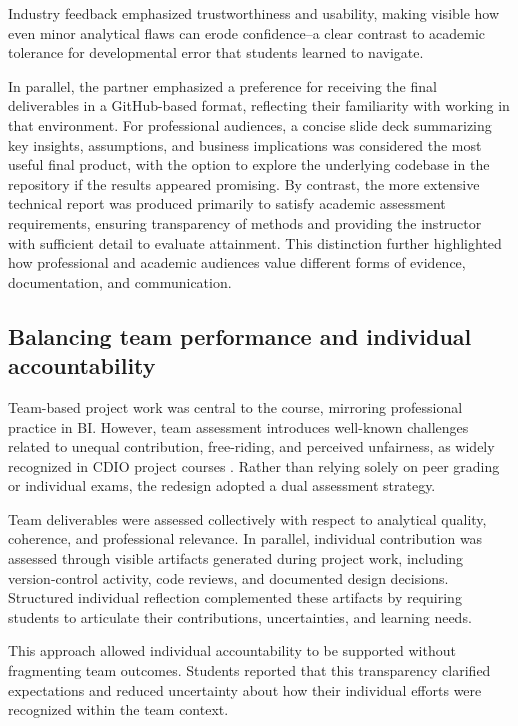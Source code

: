 Industry feedback emphasized trustworthiness and usability, making visible how even minor analytical flaws can erode confidence--a clear contrast to academic tolerance for developmental error that students learned to navigate.

In parallel, the partner emphasized a preference for receiving the final deliverables in a GitHub-based format, reflecting their familiarity with working in that environment. For professional audiences, a concise slide deck summarizing key insights, assumptions, and business implications was considered the most useful final product, with the option to explore the underlying codebase in the repository if the results appeared promising. By contrast, the more extensive technical report was produced primarily to satisfy academic assessment requirements, ensuring transparency of methods and providing the instructor with sufficient detail to evaluate attainment. This distinction further highlighted how professional and academic audiences value different forms of evidence, documentation, and communication.


\subsection{Balancing team performance and individual accountability}

Team-based project work was central to the course, mirroring professional practice in BI. However, team assessment introduces well-known challenges related to unequal contribution, free-riding, and perceived unfairness, as widely recognized in CDIO project courses \parencite{spooner2008teamwork}. Rather than relying solely on peer grading or individual exams, the redesign adopted a dual assessment strategy.

Team deliverables were assessed collectively with respect to analytical quality, coherence, and professional relevance. In parallel, individual contribution was assessed through visible artifacts generated during project work, including version-control activity, code reviews, and documented design decisions. Structured individual reflection complemented these artifacts by requiring students to articulate their contributions, uncertainties, and learning needs.

This approach allowed individual accountability to be supported without fragmenting team outcomes. Students reported that this transparency clarified expectations and reduced uncertainty about how their individual efforts were recognized within the team context.

